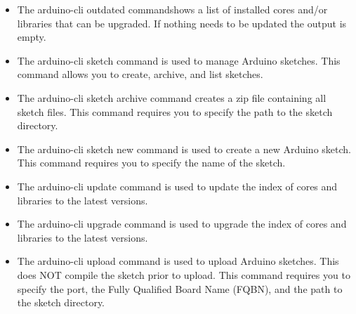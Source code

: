 \begin{itemize}
    
    \item {}
    
    The arduino-cli outdated commandshows a list of installed cores and/or libraries that can be upgraded. If nothing needs to be updated the output is empty.
    
    
    \item {}
    
    The arduino-cli sketch command is used to manage Arduino sketches. This command allows you to create, archive, and list sketches.
    
    
    \item {}
    
    The arduino-cli sketch archive command creates a zip file containing all sketch files. This command requires you to specify the path to the sketch directory.
    
    
    \item {}
    
    The arduino-cli sketch new command is used to create a new Arduino sketch. This command requires you to specify the name of the sketch.
    
    
    \item {}
    
    The arduino-cli update command is used to update the index of cores and libraries to the latest versions.
    
    
    \item {}
    
    The arduino-cli upgrade command is used to upgrade the index of cores and libraries to the latest versions.
    
    
    \item {}
    
    The arduino-cli upload command is used to upload Arduino sketches. This does NOT compile the sketch prior to upload. This command requires you to specify the port, the Fully Qualified Board Name (FQBN), and the path to the sketch directory.
    

\end{itemize}
